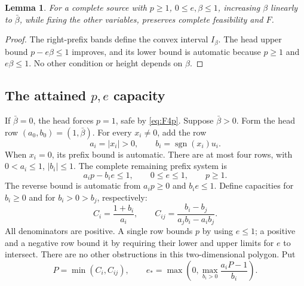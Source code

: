 \documentclass[11pt,reqno]{amsart}
\newtheorem{lemma}[theorem]{Lemma}
\theoremstyle{definition}
\theoremstyle{remark}
\DeclareMathOperator{\sgn}{sgn}
\begin{document}
\begin{lemma}\label{lem:beta}
For a complete source with \(p\ge1\), \(0\le e,\beta\le1\),
increasing \(\beta\) linearly to \(\bar\beta\), while fixing the
other variables, preserves complete feasibility and \(F\).
\end{lemma}
\begin{proof}
The right-prefix bands define the convex interval \(I_\beta\).
The head upper bound \(p-e\beta\le1\) improves, and its lower bound is
automatic because \(p\ge1\) and \(e\beta\le1\).
No other condition or height depends on \(\beta\).
\end{proof}

\subsection{The attained \texorpdfstring{\(p,e\)}{p,e} capacity}
If \(\bar\beta=0\), the head forces \(p=1\), safe by \eqref{eq:F4p}.
Suppose \(\bar\beta>0\). Form the head row
\((a_0,b_0)=(1,\bar\beta)\). For every \(x_i\ne0\), add the row
\[
a_i=|x_i|>0,\qquad b_i=\sgn(x_i)u_i.
\]
When \(x_i=0\), its prefix bound is automatic.
There are at most four rows, with \(0<a_i\le1\), \(|b_i|\le1\).
The complete remaining prefix system is
\begin{equation}\label{eq:prefixpolygon}
a_ip-b_ie\le1,\qquad0\le e\le1,\qquad p\ge1.
\end{equation}
The reverse bound is automatic from \(a_ip\ge0\) and \(b_ie\le1\).
Define capacities for \(b_i\ge0\) and for \(b_i>0>b_j\), respectively:
\[
C_i=\frac{1+b_i}{a_i},\qquad
C_{ij}=\frac{b_i-b_j}{a_jb_i-a_ib_j}.
\]
All denominators are positive. A single row bounds \(p\) by using
\(e\le1\); a positive and a negative row bound it by requiring their
lower and upper limits for \(e\) to intersect. There are no other
obstructions in this two-dimensional polygon. Put
\begin{equation}\label{eq:Pestar}
P=\min(C_i,C_{ij}),\qquad
e_*=\max\left(0,\max_{b_i>0}\frac{a_iP-1}{b_i}\right).
\end{equation}
\end{document}
